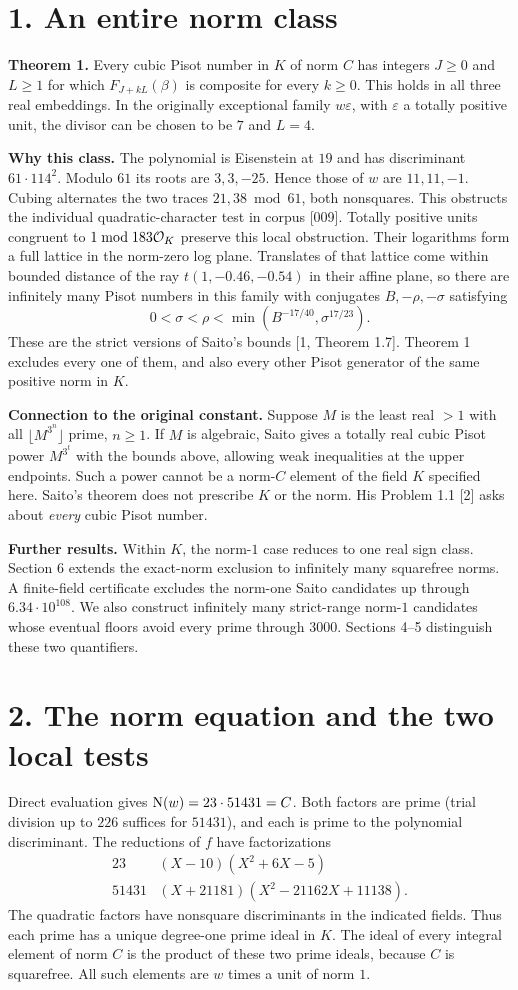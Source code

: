 \documentclass[11pt,a4paper,oneside,openany]{book}
\newcommand{\lead}[1]{\textbf{#1}\enspace}\let\para\lead
\newcommand{\localhead}[1]{\needspace{5\baselineskip}\section*{\color{ink}#1}}
\let\sect\localhead\let\secx\localhead\let\head\localhead
\begin{document}
\sect{1. An entire norm class}
\lead{Theorem 1.} Every cubic Pisot number in $K$ of norm $C$ has integers $J\ge0$ and $L\ge1$ for which $F_{J+kL}(\beta)$ is composite for every $k\ge0$. This holds in all three real embeddings. In the originally exceptional family $w\varepsilon$, with $\varepsilon$ a totally positive unit, the divisor can be chosen to be $7$ and $L=4$.

\lead{Why this class.} The polynomial is Eisenstein at $19$ and has discriminant $61\cdot114^2$. Modulo $61$ its roots are $3,3,-25$. Hence those of $w$ are $11,11,-1$. Cubing alternates the two traces $21,38\bmod61$, both nonsquares. This obstructs the individual quadratic-character test in corpus [009]. Totally positive units congruent to $1\bmod183\mathcal O_K$ preserve this local obstruction. Their logarithms form a full lattice in the norm-zero log plane. Translates of that lattice come within bounded distance of the ray $t(1,-0.46,-0.54)$ in their affine plane, so there are infinitely many Pisot numbers in this family with conjugates $B,-\rho,-\sigma$ satisfying
\[
 0<\sigma<\rho<\min(B^{-17/40},\sigma^{17/23}).
\]
These are the strict versions of Saito's bounds [1, Theorem 1.7]. Theorem 1 excludes every one of them, and also every other Pisot generator of the same positive norm in $K$.

\lead{Connection to the original constant.} Suppose $M$ is the least real $>1$ with all $\lfloor M^{3^n}\rfloor$ prime, $n\ge1$. If $M$ is algebraic, Saito gives a totally real cubic Pisot power $M^{3^t}$ with the bounds above, allowing weak inequalities at the upper endpoints. Such a power cannot be a norm-$C$ element of the field $K$ specified here. Saito's theorem does not prescribe $K$ or the norm. His Problem 1.1 [2] asks about \emph{every} cubic Pisot number.

\lead{Further results.} Within $K$, the norm-$1$ case reduces to one real sign class. Section 6 extends the exact-norm exclusion to infinitely many squarefree norms. A finite-field certificate excludes the norm-one Saito candidates up through $6.34\cdot10^{108}$. We also construct infinitely many strict-range norm-$1$ candidates whose eventual floors avoid every prime through $3000$. Sections 4--5 distinguish these two quantifiers.



\sect{2. The norm equation and the two local tests}
Direct evaluation gives $\operatorname{N}(w)=23\cdot51431=C$. Both factors are prime (trial division up to $226$ suffices for $51431$), and each is prime to the polynomial discriminant. The reductions of $f$ have factorizations
\[
\begin{array}{c|l}
23&(X-10)(X^2+6X-5)\\
51431&(X+21181)(X^2-21162X+11138).
\end{array}
\]
The quadratic factors have nonsquare discriminants in the indicated fields. Thus each prime has a unique degree-one prime ideal in $K$. The ideal of every integral element of norm $C$ is the product of these two prime ideals, because $C$ is squarefree. All such elements are $w$ times a unit of norm $1$.
\end{document}
